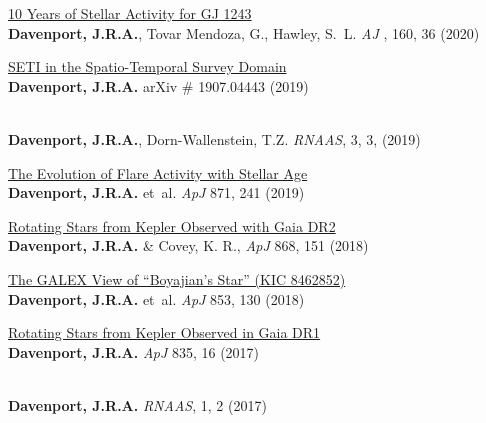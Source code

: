 \begin{etaremune}[leftmargin=10pt]

\item{\sc \href{https://arxiv.org/abs/2005.10281}{\color{NavyBlue}10 Years of Stellar Activity for GJ 1243}}\\
{\bf Davenport, J.R.A.}, Tovar Mendoza, G., Hawley, S.~L. {\em AJ }, 160, 36 (2020)



\item{\sc \href{https://arxiv.org/abs/1907.04443}{\color{NavyBlue}SETI in the Spatio-Temporal Survey Domain}}\\
{\bf Davenport, J.R.A.} arXiv \# 1907.04443 (2019)


\item{}\\
{\bf Davenport, J.R.A.}, Dorn-Wallenstein, T.Z. {\em RNAAS}, 3, 3, (2019)


\item{\sc \href{https://arxiv.org/abs/1901.00890}{\color{NavyBlue}The Evolution of Flare Activity with Stellar Age}}\\
{\bf Davenport, J.R.A.} et~al.  {\em ApJ} 871, 241 (2019)

\item{\sc \href{https://arxiv.org/abs/1807.09841}{\color{NavyBlue} Rotating Stars from Kepler Observed with Gaia DR2}}\\
{\bf Davenport, J.R.A.} \& Covey, K. R., {\em ApJ} 868, 151 (2018)


\item{\sc \href{https://arxiv.org/abs/1712.04948}{\color{NavyBlue}The GALEX View of ``Boyajian's Star'' (KIC 8462852)}}\\
{\bf Davenport, J.R.A.} et~al. {\em ApJ} 853, 130 (2018)


\item{\sc \href{https://arxiv.org/abs/1610.08563}{\color{NavyBlue} Rotating Stars from Kepler Observed in Gaia DR1}}\\
{\bf Davenport, J.R.A.} {\em ApJ} 835, 16 (2017)

\item{\href{http://adsabs.harvard.edu/abs/2017arXiv171009468D}{\color{NavyBlue}{\sc Infrared Flares from M Dwarfs: a Hinderance to Future Transiting Exoplanet Studies}}}\\
{\bf Davenport, J.R.A.} {\em RNAAS}, 1, 2 (2017)


\end{etaremune}
